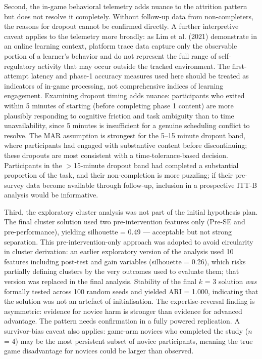 \documentclass[12pt]{report}
\begin{document}
Second, the in-game behavioral telemetry adds nuance to the attrition pattern but does not resolve it completely. Without follow-up data from non-completers, the reasons for dropout cannot be confirmed directly. A further interpretive caveat applies to the telemetry more broadly: as Lim et al. (2021) demonstrate in an online learning context, platform trace data capture only the observable portion of a learner's behavior and do not represent the full range of self-regulatory activity that may occur outside the tracked environment. The first-attempt latency and phase-1 accuracy measures used here should be treated as indicators of in-game processing, not comprehensive indices of learning engagement. Examining dropout timing adds nuance: participants who exited within 5 minutes of starting (before completing phase 1 content) are more plausibly responding to cognitive friction and task ambiguity than to time unavailability, since 5 minutes is insufficient for a genuine scheduling conflict to resolve. The MAR assumption is strongest for the 5--15 minute dropout band, where participants had engaged with substantive content before discontinuing; these dropouts are most consistent with a time-tolerance-based decision. Participants in the $>$15-minute dropout band had completed a substantial proportion of the task, and their non-completion is more puzzling; if their pre-survey data become available through follow-up, inclusion in a prospective ITT-B analysis would be informative.

Third, the exploratory cluster analysis was not part of the initial hypothesis plan. The final cluster solution used two pre-intervention features only (Pre-SE and pre-performance), yielding silhouette = 0.49 --- acceptable but not strong separation. This pre-intervention-only approach was adopted to avoid circularity in cluster derivation: an earlier exploratory version of the analysis used 10 features including post-test and gain variables (silhouette = 0.26), which risks partially defining clusters by the very outcomes used to evaluate them; that version was replaced in the final analysis. Stability of the final $k$ = 3 solution \textit{was} formally tested across 100 random seeds and yielded ARI = 1.000, indicating that the solution was not an artefact of initialisation. The expertise-reversal finding is asymmetric: evidence for novice harm is stronger than evidence for advanced advantage. The pattern needs confirmation in a fully powered replication. A survivor-bias caveat also applies: game-arm novices who completed the study ($n$ = 4) may be the most persistent subset of novice participants, meaning the true game disadvantage for novices could be larger than observed.
\end{document}
